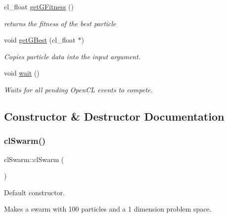 \begin{DoxyCompactItemize}
\mbox{\label{classclSwarm_a4a8496c0cbf113383a1b31e69e884783}} 
cl\+\_\+float \mbox{\hyperlink{classclSwarm_a4a8496c0cbf113383a1b31e69e884783}{get\+G\+Fitness}} ()
\begin{DoxyCompactList}\small\item\em returns the fitness of the best particle \end{DoxyCompactList}\item 
\mbox{\label{classclSwarm_a0f87b65536069b21082b5566b950acca}} 
void \mbox{\hyperlink{classclSwarm_a0f87b65536069b21082b5566b950acca}{get\+G\+Best}} (cl\+\_\+float $\ast$)
\begin{DoxyCompactList}\small\item\em Copies particle data into the input argument. \end{DoxyCompactList}\item 
\mbox{\label{classclSwarm_ac1a6c970a9c0b869858b0f6e3d73c6a3}} 
void \mbox{\hyperlink{classclSwarm_ac1a6c970a9c0b869858b0f6e3d73c6a3}{wait}} ()
\begin{DoxyCompactList}\small\item\em Waits for all pending Open\+CL events to compete. \end{DoxyCompactList}\end{DoxyCompactItemize}


\subsection{Constructor \& Destructor Documentation}
\mbox{\label{classclSwarm_a313c4986c9ae21c2649005e8b94c9756}} 
\subsubsection{\texorpdfstring{cl\+Swarm()}{clSwarm()}\hspace{0.1cm}{\footnotesize\ttfamily [1/2]}}
{\footnotesize\ttfamily cl\+Swarm\+::cl\+Swarm (\begin{DoxyParamCaption}{ }\end{DoxyParamCaption})}



Default constructor. 

Makes a swarm with 100 particles and a 1 dimension problem space. \mbox{\label{classclSwarm_a775e5804fa6fbc42cac5566652666717}} 
